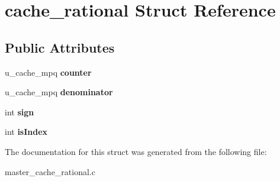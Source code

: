 \hypertarget{structcache__rational}{}\section{cache\+\_\+rational Struct Reference}
\label{structcache__rational}
\subsection*{Public Attributes}
\begin{DoxyCompactItemize}
\item 
u\+\_\+cache\+\_\+mpq {\bfseries counter}\hypertarget{structcache__rational_a54511df433a677949a075d9dcd828109}{}\label{structcache__rational_a54511df433a677949a075d9dcd828109}

\item 
u\+\_\+cache\+\_\+mpq {\bfseries denominator}\hypertarget{structcache__rational_a2b157940bfede9e63bf5848cecbb7493}{}\label{structcache__rational_a2b157940bfede9e63bf5848cecbb7493}

\item 
int {\bfseries sign}\hypertarget{structcache__rational_a8dcedc57b6c8b5b41f90a3c551003650}{}\label{structcache__rational_a8dcedc57b6c8b5b41f90a3c551003650}

\item 
int {\bfseries is\+Index}\hypertarget{structcache__rational_a7cb2129d5be2288209eebeefe9f14e3b}{}\label{structcache__rational_a7cb2129d5be2288209eebeefe9f14e3b}

\end{DoxyCompactItemize}


The documentation for this struct was generated from the following file\+:\begin{DoxyCompactItemize}
\item 
master\+\_\+cache\+\_\+rational.\+c\end{DoxyCompactItemize}
